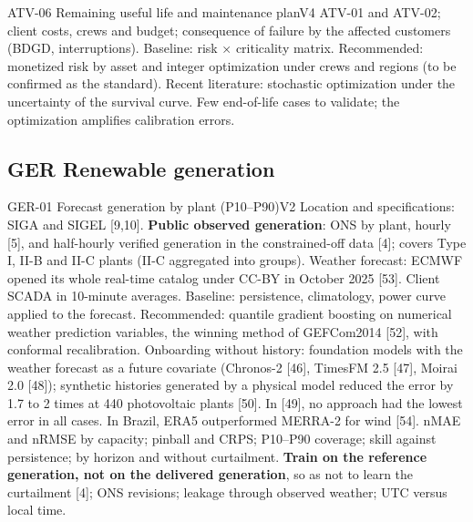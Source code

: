 \begin{ficha}{ATV-06 \textperiodcentered{} Remaining useful life and maintenance plan}{V4}
 ATV-01 and ATV-02; client costs, crews and budget;
consequence of failure by the affected customers (BDGD, interruptions).
 Baseline: risk × criticality matrix. Recommended:
monetized risk by asset and integer optimization under crews and regions (to
be confirmed as the standard). Recent literature: stochastic optimization under the
uncertainty of the survival curve.
 Few end-of-life cases to validate; the optimization amplifies
calibration errors.
\end{ficha}

\subsection{GER \textperiodcentered{} Renewable generation}

\begin{ficha}{GER-01 \textperiodcentered{} Forecast generation by plant (P10--P90)}{V2}
 Location and specifications: SIGA and SIGEL [9,10]. \textbf{Public observed
generation}: ONS by plant, hourly [5], and half-hourly verified
generation in the constrained-off data [4]; covers Type I, II-B and II-C plants (II-C
aggregated into groups). Weather forecast: ECMWF opened its whole real-time
catalog under CC-BY in October 2025 [53]. Client SCADA in 10-minute
averages.
 Baseline: persistence, climatology, power
curve applied to the forecast. Recommended: quantile gradient boosting on
numerical weather prediction variables, the winning method of GEFCom2014 [52], with
conformal recalibration. Onboarding without history: foundation models with the
weather forecast as a future covariate (Chronos-2 [46], TimesFM 2.5 [47],
Moirai 2.0 [48]); synthetic histories generated by a physical model reduced the
error by 1.7 to 2 times at 440 photovoltaic plants [50]. In [49], no
approach had the lowest error in all cases. In Brazil, ERA5 outperformed MERRA-2 for wind [54].
 nMAE and nRMSE by capacity; pinball and CRPS; P10--P90
coverage; skill against persistence; by horizon and without curtailment.
 \textbf{Train on the reference generation, not on the
delivered generation}, so as not to learn the curtailment [4]; ONS revisions; leakage
through observed weather; UTC versus local time.
\end{ficha}

